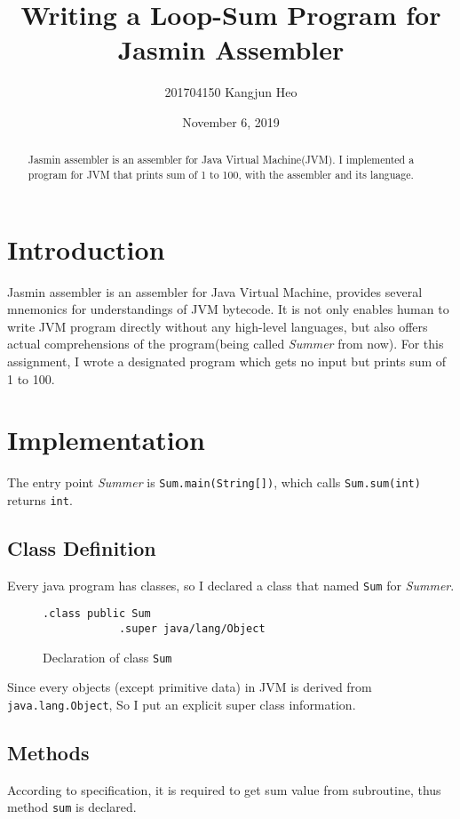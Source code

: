 \documentclass[a4paper, 12pt]{article}
\title{Writing a Loop-Sum Program for Jasmin Assembler}
\date{November 6, 2019}
\author{201704150 Kangjun Heo}
\begin{document}
    \maketitle

    \begin{abstract}
        Jasmin assembler is an assembler for Java Virtual Machine(JVM). I implemented a program for JVM that prints sum of 1 to 100, with the assembler and its language.
    \end{abstract}

    \section{Introduction}
    Jasmin assembler is an assembler for Java Virtual Machine, provides several mnemonics for understandings of JVM bytecode. It is not only enables human to write JVM program directly without any high-level languages, but also offers actual comprehensions of the program(being called \textit{Summer} from now). For this assignment, I wrote a designated program which gets no input but prints sum of 1 to 100.

    \section{Implementation}
    The entry point \textit{Summer} is \texttt{Sum.main(String[])}, which calls \texttt{Sum.sum(int)} returns \texttt{int}.

        \subsection{Class Definition}
        Every java program has classes, so I declared a class that named \texttt{Sum} for \textit{Summer}.
        \begin{figure}[H]
            \begin{lstlisting}[gobble=8]
            .class public Sum
            .super java/lang/Object
            \end{lstlisting}
    
            \centering        
            \caption{Declaration of class \texttt{Sum}}
        \end{figure}
        Since every objects (except primitive data) in JVM is derived from \texttt{java.lang.Object}, So I put an explicit super class information.  

        \subsection{Methods}
        According to specification, it is required to get sum value from subroutine, thus method \texttt{sum} is declared.
\end{document}
